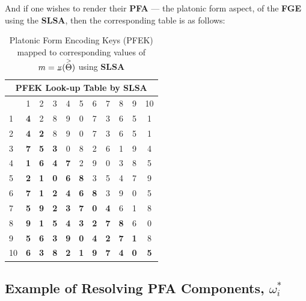 \documentclass[a4paper, 18pt]{book} %
\newcommand{\invpi}{\rotatebox[origin=c]{180}{$\pi$}}
\begin{document}
\begin{appendices}
And if one wishes to render their \textbf{PFA} --- the platonic form aspect, of the \textbf{FGE} using the \textbf{SLSA}, then the corresponding table is as follows:\\


 
\begin{table}[H]
  \centering
  \Large
	\begin{tabular}[t]{|p{6cm}||c|c|c|c|c|c|c|c|c|c|}
	\hline
	\multicolumn{11}{|c|}{\textbf{PFEK Look-up Table by SLSA}}\\
	\hline
	\hline
	\diagbox{$m = \invpi(\overset{>}{\Theta})$}{$I(\omega_i,\overset{>}{\Theta})$} & 1 & 2 & 3 & 4 & 5 & 6 & 7 & 8 & 9 & 10\\
	\hline
	\hline
	1 & \textbf{4} & 2 & 8 & 9 & 0 & 7 & 3 & 6 & 5 & 1\\ 
	\hline
	2 & \textbf{4} & \textbf{2} & 8 & 9 & 0 & 7 & 3 & 6 & 5 & 1\\ 
	\hline
	3 & \textbf{7} & \textbf{5} & \textbf{3} & 0 & 8 & 2 & 6 & 1 & 9 & 4\\ 
	\hline
	4 & \textbf{1} & \textbf{6} & \textbf{4} & \textbf{7} & 2 & 9 & 0 & 3 & 8 & 5\\ 
	\hline
	5 & \textbf{2} & \textbf{1} & \textbf{0} & \textbf{6} & \textbf{8} & 3 & 5 & 4 & 7 & 9\\ 
	\hline
	6 & \textbf{7} & \textbf{1} & \textbf{2} & \textbf{4} & \textbf{6} & \textbf{8} & 3 & 9 & 0 & 5\\ 
	\hline
	7 & \textbf{5} & \textbf{9} & \textbf{2} & \textbf{3} & \textbf{7} & \textbf{0} & \textbf{4} & 6 & 1 & 8\\ 
	\hline
	8 & \textbf{9} & \textbf{1} & \textbf{5} & \textbf{4} & \textbf{3} & \textbf{2} & \textbf{7} & \textbf{8} & 6 & 0\\ 
	\hline
	9 & \textbf{5} & \textbf{6} & \textbf{3} & \textbf{9} & \textbf{0} & \textbf{4} & \textbf{2} & \textbf{7} & \textbf{1} & 8\\ 
	\hline
	10 & \textbf{6} & \textbf{3} & \textbf{8} & \textbf{2} & \textbf{1} & \textbf{9} & \textbf{7} & \textbf{4} & \textbf{0} & \textbf{5}\\
	              \hline
\end{tabular}
 \caption{Platonic Form Encoding Keys (PFEK) mapped to corresponding values of $m = \invpi(\overset{>}{\Theta})$ using \textbf{SLSA}}
  \label{TABSSLAPERK}
\end{table}

\subsection{Example of Resolving PFA Components, $\boxed{\omega_i^*}$}


\end{appendices}
\end{document}
